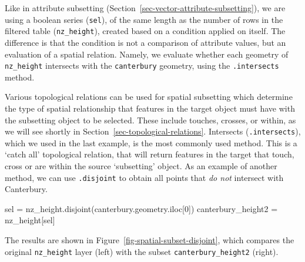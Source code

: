 \documentclass[
  letterpaper,
]{krantz}
\newenvironment{Shaded}{\begin{snugshade}}{\end{snugshade}}
\newcommand{\DecValTok}[1]{\textcolor[rgb]{0.68,0.00,0.00}{#1}}
\newcommand{\NormalTok}[1]{\textcolor[rgb]{0.00,0.23,0.31}{#1}}
\newcommand{\OperatorTok}[1]{\textcolor[rgb]{0.37,0.37,0.37}{#1}}
\begin{document}
Like in attribute subsetting
(Section~\ref{sec-vector-attribute-subsetting}), we are using a boolean
series (\texttt{sel}), of the same length as the number of rows in the
filtered table (\texttt{nz\_height}), created based on a condition
applied on itself. The difference is that the condition is not a
comparison of attribute values, but an evaluation of a spatial relation.
Namely, we evaluate whether each geometry of \texttt{nz\_height}
intersects with the \texttt{canterbury} geometry, using the
\texttt{.intersects} method.

Various topological relations can be used for spatial subsetting which
determine the type of spatial relationship that features in the target
object must have with the subsetting object to be selected. These
include touches, crosses, or within, as we will see shortly in
Section~\ref{sec-topological-relations}. Intersects
(\texttt{.intersects}), which we used in the last example, is the most
commonly used method. This is a `catch all' topological relation, that
will return features in the target that touch, cross or are within the
source `subsetting' object. As an example of another method, we can use
\texttt{.disjoint} to obtain all points that \emph{do not} intersect
with Canterbury.

\begin{Shaded}
\begin{Highlighting}[]
\NormalTok{sel }\OperatorTok{=}\NormalTok{ nz\_height.disjoint(canterbury.geometry.iloc[}\DecValTok{0}\NormalTok{])}
\NormalTok{canterbury\_height2 }\OperatorTok{=}\NormalTok{ nz\_height[sel]}
\end{Highlighting}
\end{Shaded}

The results are shown in Figure~\ref{fig-spatial-subset-disjoint}, which
compares the original \texttt{nz\_height} layer (left) with the subset
\texttt{canterbury\_height2} (right).
\end{document}
